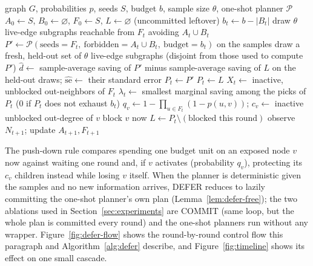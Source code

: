 \documentclass[preprint,11pt]{elsarticle}
\theoremstyle{definition}
\theoremstyle{remark}
\begin{document}
\begin{algorithm}[h]
\caption{DEFER}\label{alg:defer}
\begin{algorithmic}[1]
\Require graph $G$, probabilities $p$, seeds $S$, budget $b$, sample size
  $\theta$, one-shot planner $\mathcal P$
\State $A_0\gets S$, $B_0\gets\varnothing$, $F_0\gets S$, $L\gets\varnothing$ (uncommitted leftover)
  \State $b_t\gets b-|B_t|$
  \State draw $\theta$ live-edge subgraphs reachable from $F_t$ avoiding $A_t\cup B_t$
  \State $P'\gets\mathcal P(\text{seeds}=F_t,\ \text{forbidden}=A_t\cup B_t,\ \text{budget}=b_t)$ on the samples
  \State draw a fresh, held-out set of $\theta$ live-edge subgraphs (disjoint from those used to compute $P'$)
  \State $\hat d\gets$ sample-average saving of $P'$ minus sample-average saving of $L$ on the held-out draws; $\widehat{\mathrm{se}}\gets$ their standard error
   
    \State $P_t\gets P'$
  \Else
    \State $P_t\gets L$
  \EndIf
  \State $X_t\gets$ inactive, unblocked out-neighbors of $F_t$
  \State $\lambda_t\gets$ smallest marginal saving among the picks of $P_t$ (0 if $P_t$ does not exhaust $b_t$)
  \label{alg:pushdown-start}
    \State $q_v\gets 1-\prod_{u\in F_t}(1-p(u,v))$; $c_v\gets$ inactive unblocked out-degree of $v$
     
      \State block $v$ now
    \EndIf
  \EndFor\label{alg:pushdown-end}
  \State $L\gets P_t\setminus(\text{blocked this round})$
  \State observe $N_{t+1}$; update $A_{t+1},F_{t+1}$
\EndFor
\end{algorithmic}
\end{algorithm}

The push-down rule compares spending one budget unit on an exposed node $v$
now against waiting one round and, if $v$ activates (probability $q_v$),
protecting its $c_v$ children instead while losing $v$ itself. When the
planner is deterministic given the samples and no new information arrives,
DEFER reduces to lazily committing the one-shot planner's own plan
(Lemma~\ref{lem:defer-free}); the two ablations used in
Section~\ref{sec:experiments} are COMMIT (same loop, but the whole plan is
committed every round) and the one-shot planners run without any wrapper.
Figure~\ref{fig:defer-flow} shows the round-by-round control flow this
paragraph and Algorithm~\ref{alg:defer} describe, and Figure~\ref{fig:timeline} shows its effect on one small cascade.
\end{document}
